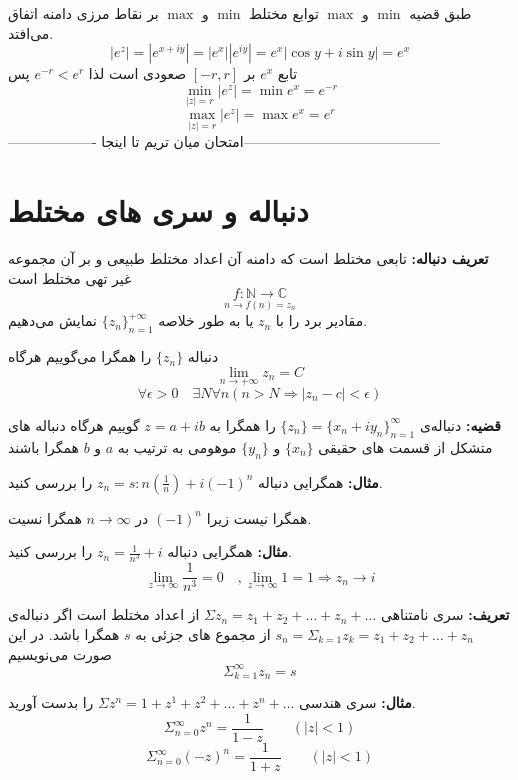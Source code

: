 \documentclass[12pt]{report}
\begin{document}
	طبق قضیه 
	$\min$
	و 
	$\max$
	توابع مختلط
	$\min$
	و 
	$\max$
	بر نقاط مرزی دامنه اتفاق می‌افتد.
	$$|e^z| = |e^{x + iy}| = |e^x||e^{iy}| = e^x|\cos y + i\sin y| = e^x$$
	تابع 
	$e^x$
	بر 
	$[-r, r]$
	صعودی است لذا
	$e^{-r} < e^r$
	پس
	$$\min_{|z| = r} |e^z| = \min e^x = e^{-r}$$
	$$\max_{|z| = r} |e^z| = \max e^x = e^{r}$$
	------------------- امتحان میان تریم تا اینجا------------------------------------------
	\chapter{دنباله و سری های مختلط}
	
	\textbf{تعریف دنباله:}
	تابعی مختلط است که دامنه آن اعداد مختلط طبیعی و بر آن مجموعه غیر تهی مختلط است
	$$ \underset{n \to f(n) = z_n}{f: \mathbb{N} \to \mathbb{C}}$$
	مقادیر برد را با 
	$z_n$
	یا به طور خلاصه 
	$\{z_n\}_{n =1}^{+\infty}$
	نمایش می‌دهیم.
	
	دنباله 
	$\{z_n\}$
	را همگرا می‌گوییم هرگاه
	$$\lim_{n \to +\infty} z_n = C$$
	$$\forall \epsilon > 0 \quad\exists N \forall n(n > N \Rightarrow |z_n - c| < \epsilon)$$
	\newline
	
	\textbf{قضیه:}
	دنباله‌ی
	$\{z_n\} = \{x_n + i y_n\}_{n  = 1}^{\infty}$
	را همگرا به 
	$z = a + ib$
	گوییم هرگاه دنباله های متشکل از قسمت های حقیقی
	$\{x_n\}$
	و
	$\{y_n\}$
	موهومی به ترتیب به
	$a$
	و
	$b$
	همگرا باشند
	\newline
	
	\textbf{مثال:}
	همگرایی دنباله
	$z_n = s : n (\frac{1}{n}) + i(-1)^n$
	را بررسی کنید.
	
	همگرا نیست زیرا
	$(-1)^n$
	در 
	$n \to \infty$
	همگرا نسیت.
	\newline
	
	\textbf{مثال:}
	همگرایی دنباله 
	$z_n = \frac{1}{n^3} + i$
	را بررسی کنید.
	$$\lim_{z \to \infty} \frac{1}{n^3} = 0 \quad , \lim_{z \to \infty} 1 = 1 \Rightarrow z_n \to i$$
	\newline
	
	\textbf{تعریف:}
	سری نامتناهی
	$\Sigma z_n = z_1 + z_2 +\dots + z_n + \dots$
	از اعداد مختلط است اگر دنباله‌ی
	$s_n = \Sigma_{k = 1} z_k =z_1 + z_2 +\dots + z_n $
	از مجموع های جزئی به 
	$s$
	همگرا باشد. در این صورت می‌نویسیم
	$$\Sigma_{k = 1}^{\infty} z_n = s$$
	\newline
	
	\textbf{مثال:}
	سری هندسی 
	$\Sigma z^n = 1 + z^1 + z^2 + \dots + z^n + \dots$
	را بدست آورید.
	$$\Sigma_{n = 0}^{\infty} z^n = \frac{1}{1  -z} \qquad (|z| < 1)$$
	$$\Sigma_{n = 0}^{\infty} (-z)^n  = \frac{1}{1  +z} \qquad (|z| < 1)$$
	\newline
	
\end{document}
